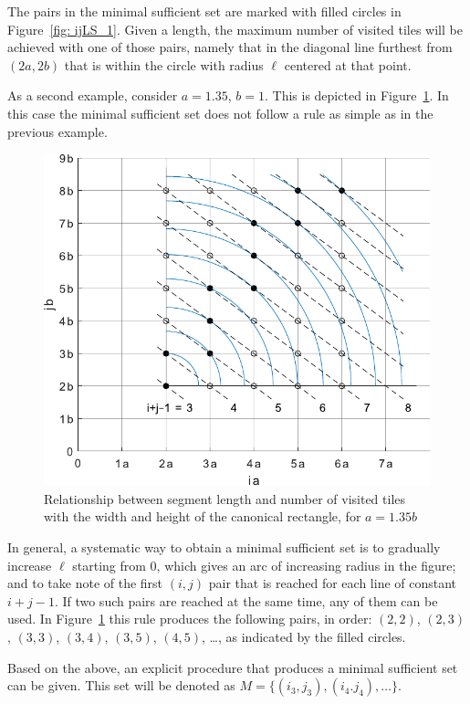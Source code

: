 \documentclass[12pt, a4paper]{article}
\newcommand{\len}{\ell} %
\newcommand{\mss}{M}
\newcommand{\touched}{visited}
\begin{document}
The pairs in the minimal sufficient set are marked with filled circles in Figure~\ref{fig: ijLS_1}. Given a length, the maximum number of \touched{} tiles will be achieved with one of those pairs, namely that in the diagonal line furthest from $(2a,2b)$ that is within the circle with radius $\len$ centered at that point.

As a second example, consider $a=1.35$, $b=1$. This is depicted in Figure~\ref{fig: ijLS_1p35}. In this case the minimal sufficient set does not follow a rule as simple as in the previous example.

\begin{figure}
\centering%
\includegraphics[width=.7\textwidth]{ijLS_1p35}%
\caption{Relationship between segment length and number of \touched{} tiles with the width and height of the canonical rectangle, for $a=1.35b$
}%
\label{fig: ijLS_1p35}%
\end{figure}%

In general, a systematic way to obtain a minimal sufficient set is to gradually increase $\len$ starting from $0$, which gives an arc of increasing radius in the figure; and to take note of the first $(i,j)$ pair that is reached for each line of constant $i+j-1$. If two such pairs are reached at the same time, any of them can be used. In Figure~\ref{fig: ijLS_1p35} this rule produces the following pairs, in order: $(2,2)$, $(2,3)$, $(3,3)$, $(3,4)$, $(3,5)$, $(4,5)$, \ldots, as indicated by the filled circles.

Based on the above, an explicit procedure that produces a minimal sufficient set can be given. This set will be denoted as $\mss = \{(i_3,j_3), (i_4.j_4), \ldots\}$.
\end{document}
